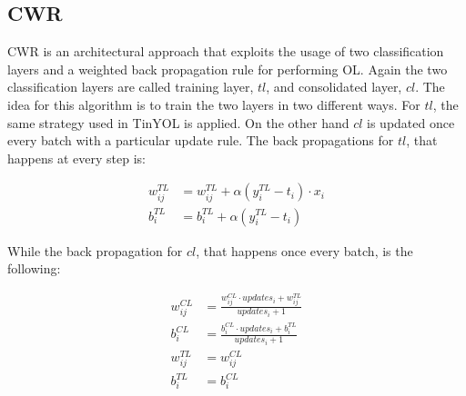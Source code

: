\documentclass[12pt]{report}
\begin{document}
\subsection{CWR}
CWR is an architectural approach that exploits the usage of two classification layers and a weighted back propagation rule for performing OL. Again the two classification layers are called training layer, $tl$, and consolidated layer, $cl$. The idea for this algorithm is to train the two layers in two different ways. For $tl$, the same strategy used in TinYOL is applied. On the other hand $cl$ is updated once every batch with a particular update rule. The back propagations for $tl$, that happens at every step is:

\begin{align}
	w^{TL}_{ij} &= w^{TL}_{ij} + \alpha (y^{TL}_i - t_i) \cdot x_i \\
    b^{TL}_i    &= b^{TL}_i + \alpha  (y^{TL}_i - t_i) 
\end{align}

While the back propagation for $cl$, that happens once every batch, is the following:

\begin{align}
	w^{CL}_{ij} &= \frac{w^{CL}_{ij} \cdot updates_{i} + w^{TL}_{ij}}{updates_{i} + 1} \label{cwrweight}\\ 
	b^{CL}_{i}  &= \frac{b^{CL}_{i} \cdot updates_{i} + b^{TL}_{i}}{updates_{i} + 1} \\ 
    w^{TL}_{ij} &=  w^{CL}_{ij} \\
    b^{TL}_{i}  &=  b^{CL}_{i} 
\end{align}
\end{document}
